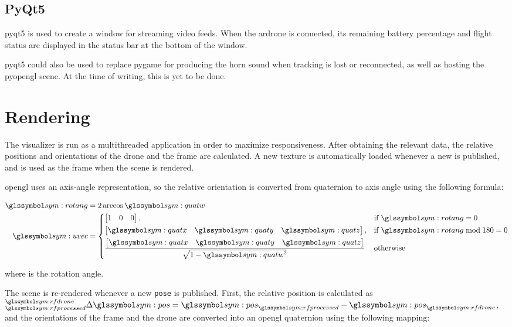     \subsection{PyQt5}
    \gls{pyqt5} is used to create a window for streaming video feeds.
    When the \gls{ardrone} is connected, its remaining battery percentage and flight status are displayed in the status bar at the bottom of the window.

    \gls{pyqt5} could also be used to replace \gls{pygame} for producing the horn sound when tracking is lost or reconnected, as well as hosting the \gls{pyopengl} scene.
    At the time of writing, this is yet to be done.

  \section{Rendering}
    The visualizer is run as a multithreaded application in order to maximize responsiveness.
    After obtaining the relevant data, the relative positions and orientations of the drone and the frame are calculated.
    A new texture is automatically loaded whenever a new \texttt{} is published, and is used as the frame when the scene is rendered.

    \gls{opengl} uses an axis-angle representation, so the relative orientation is converted from quaternion to axis angle using the following formula:

    \begin{align}
      \sym{rotang} &= 2\arccos\sym{quatw} \\
      \sym{uvec} &= 
      \begin{dcases}
	\begin{bmatrix}1 & 0 & 0\end{bmatrix},& \text{if } \sym{rotang} = 0 \\
	\begin{bmatrix}\sym{quatx} & \sym{quaty} & \sym{quatz}\end{bmatrix},& \text{if } \sym{rotang} \bmod 180 = 0 \\
      \frac{\begin{bmatrix}\sym{quatx} & \sym{quaty} & \sym{quatz}\end{bmatrix}}{\sqrt{1 - \sym{quatw}^2}} & \text{otherwise}
      \end{dcases}
    \end{align}

    where  is the rotation angle.

    The scene is re-rendered whenever a new \texttt{pose} is published.
    First, the relative position is calculated as $^{\sym{rfdrone}}_{\sym{rfprocessed}}\Delta\sym{pos} = \sym{pos}_{\sym{rfprocessed}} - \sym{pos}_{\sym{rfdrone}}$, and the orientations of the frame and the drone are converted into an \gls{opengl} quaternion using the following mapping:

